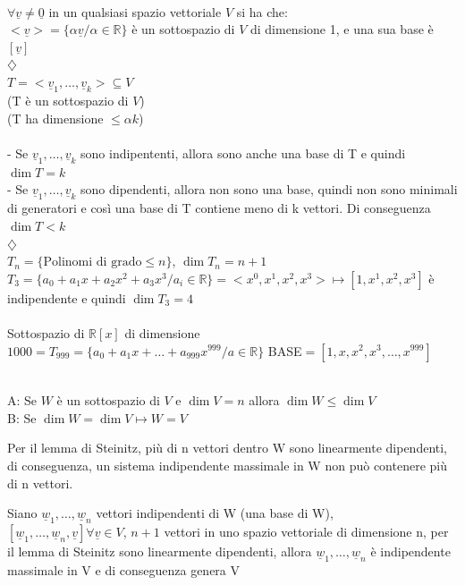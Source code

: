 \begin{proposizione}
  \phantom{text}\\
  $\forall\underline{v}\neq\underline{0}$ in un qualsiasi spazio
  vettoriale $V$ si ha che:\\
  $<\underline{v}>=\{\alpha\underline{v}/\alpha\in\mathbb{R}\}$ è un
  sottospazio di $V$ di dimensione 1, e una sua base è
  $[\underline{v}]$\\$\diamondsuit$\\
  $T=<\underline{v}_1,\dots,\underline{v}_k>\subseteq V$\\
  (T è un sottospazio di $V$)\\
  (T ha dimensione $\leqslant\alpha k$)\\\\
  - Se $\underline{v}_1,\dots,\underline{v}_k$ sono indipententi,
  allora sono anche una base di T e quindi $\dim T=k$\\
  - Se $\underline{v}_1,\dots,\underline{v}_k$ sono dipendenti,
  allora non sono una base, quindi non sono minimali di generatori e
  così una base di T contiene meno di k vettori. Di conseguenza $\dim
  T<k$\\$\diamondsuit$\\
  $T_n=\{\text{Polinomi di grado}\leqslant n\}$, $\dim T_n=n+1$\\
  $T_3=\{a_0+a_1 x+a_2 x^2+a_3
  x^3/a_i\in\mathbb{R}\}=<x^0,x^1,x^2,x^3>\mapsto[1,x^1,x^2,x^3]$ è
  indipendente e quindi $\dim T_3=4$\\\\
  Sottospazio di $\mathbb{R}[x]$ di dimensione
  $1000=T_{999}=\{a_0+a_1 x+\dots+a_{999}x^{999}/a\in\mathbb{R}\}$
  BASE$=[1,x,x^2,x^3,\dots,x^{999}]$
\end{proposizione}

\begin{proposizione}
  \phantom{text}\\
  A: Se $W$ è un sottospazio di $V$ e $\dim V=n$ allora $\dim
  W\leqslant\dim V$\\
  B: Se $\dim W=\dim V\mapsto W=V$
  \begin{dimostrazione}[A]
    Per il lemma di Steinitz, più di n vettori dentro W sono
    linearmente dipendenti, di conseguenza, un sistema indipendente
    massimale in W non può contenere più di n vettori.
  \end{dimostrazione}
  \begin{dimostrazione}[B]
    Siano $\underline{w}_1,\dots,\underline{w}_n$ vettori
    indipendenti di W (una base di W),
    \\$[\underline{w}_1,\dots,\underline{w}_n,\underline{v}]\forall\underline{v}\in
    V$, $n+1$ vettori in uno spazio vettoriale di dimensione n, per
    il lemma di Steinitz sono linearmente dipendenti, allora
    $\underline{w}_1,\dots,\underline{w}_n$ è indipendente massimale
    in V e di conseguenza genera V
  \end{dimostrazione}
\end{proposizione}

